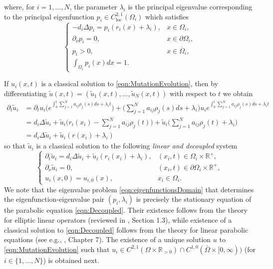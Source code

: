 \documentclass{article}
\begin{document}
where, for $i=1,\ldots, N$, the parameter $\lambda_i$ is the principal eigenvalue corresponding to the principal eigenfunction $p_i\in{}C^{2,1}_{\text{loc}}(\Omega_i)$ which satisfies
\begin{equation}\label{eqn:eigenfunctionsDomain}
      \begin{cases}
        -d_i\Delta{}p_i=p_i\left(r_i(x)+\lambda_i\right),&x\in{\Omega_i},
    \\
    \partial_\nu{}p_i=0,&x\in\partial{\Omega}_i,\\
   p_i>0,&x\in\overline{\Omega}_{i},\\
   \int_{\Omega_i}p_i(x)dx=1.
      \end{cases}
  \end{equation}


If $u_i(x,t)$ is a classical solution to \eqref{eqn:MutationEvolution}, then by differentiating $\tilde{u}(x,t)=(\tilde{u}_1(x,t),...,\tilde{u}_N(x,t))$ with respect to $t$ we obtain
\begin{align*}
\partial_{t}\tilde{u}_i&=\partial_{t}u_i\Big(e^{\int_{0}^ t\sum_{j=1}^Na_{ij}\rho_j(s)ds+\lambda_it}\Big)+\Big(\sum_{j=1}^Na_{ij}\rho_j(s)ds+\lambda_i\Big)u_ie^{{\int_{0}^ t\sum_{j=1}^Na_{ij}\rho_j(s)ds+\lambda_it}}\\
&=d_i\Delta{}\tilde{u}_i+\tilde{u}_i\Big(r_i(x_i)-\sum_{j=1}^Na_{ij}\rho_j(t)\Big)+\tilde{u}_i\Big(\sum_{j=1}^Na_{ij}\rho_j(t)+\lambda_i\Big)\\
    &=d_i\Delta{\tilde{u}_i}+\tilde{u}_i(r(x_i)+\lambda_i)
\end{align*}
so that $\tilde{u}_i$ is a classical solution to the following \textit{linear and decoupled} system 
\begin{equation}\label{eqn:Decoupled}
      \begin{cases}
          \partial_{t}\tilde{u}_i=d_i\Delta{\tilde{u}}_i+\tilde{u}_i\left(r_i(x_i)+\lambda_i\right),&(x_i,t)\in\Omega_i\times\mathbb{R}^{+},
    \\
    
    \partial_{\nu}\tilde{u}_i=0,&(x_i,t)\in\partial{\Omega_i}\times\mathbb{R}^{+},\\
    
    u_i(x,0)=u_{i,0}(x),&x_i\in\Omega_i.
      \end{cases}
  \end{equation}
We note that the eigenvalue problem \eqref{eqn:eigenfunctionsDomain} that determines the eigenfunction-eigenvalue pair $(p_i,\lambda_i)$ is precisely the stationary equation of the parabolic equation \eqref{eqn:Decoupled}. Their existence  follows from the theory for elliptic linear operators (reviewed in \cite{lam2022introduction}, Section 1.3), while existence of a classical solution to \eqref{eqn:Decoupled} follows from the theory for linear parabolic equations (see e.g., \cite{evans2022partial}, Chapter 7). The existence of a unique solution $u$ to \eqref{eqn:MutationEvolution} such that $u_i\in{}C^{2,1}(\Omega\times\mathbb{R}_{>0})\cap{}C^{1,0}(\bar{\Omega}\times[0,\infty))$ (for $i\in\{1,...,N\}$) is obtained next.
\end{document}
